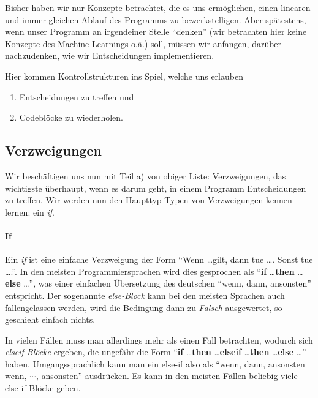 
Bisher haben wir nur Konzepte betrachtet, die es uns ermöglichen, einen linearen und immer gleichen Ablauf des Programms zu bewerkstelligen. Aber spätestens, wenn unser Programm an irgendeiner Stelle \enquote{denken} (wir betrachten hier keine Konzepte des Machine Learnings o.ä.) soll, müssen wir anfangen, darüber nachzudenken, wie wir Entscheidungen implementieren.

Hier kommen Kontrollstrukturen ins Spiel, welche uns erlauben
\begin{enumerate}[label = \alph*)]
	\item Entscheidungen zu treffen und
	\item Codeblöcke zu wiederholen.
\end{enumerate}

\subsection{Verzweigungen} \functionalMark \imperativeMark \oopMark

	Wir beschäftigen uns nun mit Teil a) von obiger Liste: Verzweigungen, das wichtigste überhaupt, wenn es darum geht, in einem Programm Entscheidungen zu treffen. Wir werden nun den Haupttyp Typen von Verzweigungen kennen lernen: ein \textit{if}.

	\paragraph{If}
		Ein \textit{if} ist eine einfache Verzweigung der Form \enquote{Wenn \dots gilt, dann tue \dots. Sonst tue \dots.}. In den meisten Programmiersprachen wird dies gesprochen als \enquote{\textbf{if} \dots \textbf{then} \dots \textbf{else} \dots}, was einer einfachen Übersetzung des deutschen \enquote{wenn, dann, ansonsten} entspricht. Der sogenannte \textit{else-Block} kann bei den meisten Sprachen auch fallengelassen werden, wird die Bedingung dann zu \textit{Falsch} ausgewertet, so geschieht einfach nichts.
		
		In vielen Fällen muss man allerdings mehr als einen Fall betrachten, wodurch sich \textit{elseif-Blöcke} ergeben, die ungefähr die Form \enquote{\textbf{if} \dots \textbf{then} \dots \textbf{elseif} \dots \textbf{then} \dots \textbf{else} \dots} haben. Umgangssprachlich kann man ein else-if also als \enquote{wenn, dann, ansonsten wenn, $ \cdots $, ansonsten} ausdrücken. Es kann in den meisten Fällen beliebig viele else-if-Blöcke geben.


